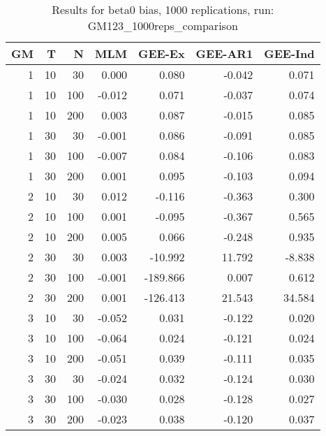 \begin{table}[ht]
\centering
\begin{tabular}{rrrrrrr}
  \hline
GM & T & N & MLM & GEE-Ex & GEE-AR1 & GEE-Ind \\ 
  \hline
1 & 10 & 30 & 0.000 & 0.080 & -0.042 & 0.071 \\ 
  1 & 10 & 100 & -0.012 & 0.071 & -0.037 & 0.074 \\ 
  1 & 10 & 200 & 0.003 & 0.087 & -0.015 & 0.085 \\ 
  1 & 30 & 30 & -0.001 & 0.086 & -0.091 & 0.085 \\ 
  1 & 30 & 100 & -0.007 & 0.084 & -0.106 & 0.083 \\ 
  1 & 30 & 200 & 0.001 & 0.095 & -0.103 & 0.094 \\ 
   \hline
2 & 10 & 30 & 0.012 & -0.116 & -0.363 & 0.300 \\ 
  2 & 10 & 100 & 0.001 & -0.095 & -0.367 & 0.565 \\ 
  2 & 10 & 200 & 0.005 & 0.066 & -0.248 & 0.935 \\ 
  2 & 30 & 30 & 0.003 & -10.992 & 11.792 & -8.838 \\ 
  2 & 30 & 100 & -0.001 & -189.866 & 0.007 & 0.612 \\ 
  2 & 30 & 200 & 0.001 & -126.413 & 21.543 & 34.584 \\ 
   \hline
3 & 10 & 30 & -0.052 & 0.031 & -0.122 & 0.020 \\ 
  3 & 10 & 100 & -0.064 & 0.024 & -0.121 & 0.024 \\ 
  3 & 10 & 200 & -0.051 & 0.039 & -0.111 & 0.035 \\ 
  3 & 30 & 30 & -0.024 & 0.032 & -0.124 & 0.030 \\ 
  3 & 30 & 100 & -0.030 & 0.028 & -0.128 & 0.027 \\ 
  3 & 30 & 200 & -0.023 & 0.038 & -0.120 & 0.037 \\ 
   \hline
\end{tabular}
\caption{Results for beta0 bias, 1000 replications, run: GM123_1000reps_comparison} 
\label{tab:beta0_bias}
\end{table}
